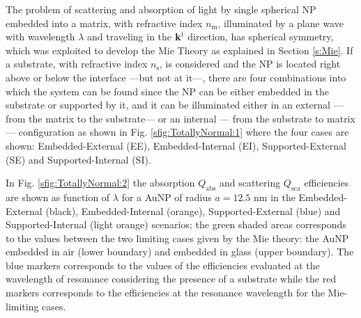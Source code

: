 
The problem of scattering and absorption of light by single spherical NP embedded into a matrix, with refractive index $n_\text{m}$, illuminated by a plane wave with wavelength $\lambda$  and traveling in the  $\vb{k}^\text{i}$ direction, has spherical symmetry, which was exploited to develop the Mie Theory as explained in Section \ref{s:Mie}. If a substrate, with refractive index $n_\text{s}$, is considered and the NP is located right above or below the interface ---but not at it---, there are four combinations into which the system can be found since the NP can be either embedded  in the substrate or supported by it, and it can be illuminated either in an external ---from the matrix to the substrate--- or an internal --- from the substrate to matrix--- configuration as shown in Fig. \ref{sfig:TotallyNormal:1} where the four cases are shown: Embedded-External (EE), Embedded-Internal (EI), Supported-External (SE) and Supported-Internal (SI).

In Fig. \ref{sfig:TotallyNormal:2} the absorption $Q_\text{abs}$ and scattering $Q_\text{sca}$ efficiencies are shown as function of $\lambda$ for a AuNP of radius $a = 12.5$ nm in the Embedded-External (black), Embedded-Internal (orange), Supported-External (blue) and Supported-Internal (light orange) scenarios; the green shaded areas corresponds to the values between the two limiting cases given by the Mie theory: the AuNP embedded in air (lower boundary) and embedded in glass (upper boundary). The blue markers corresponds to the values of the efficiencies evaluated at the wavelength of resonance considering the presence of a substrate while the red markers corresponds to the efficiencies at the resonance wavelength for the Mie-limiting cases.

